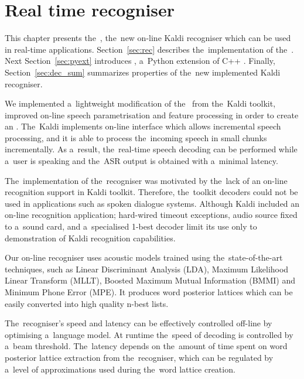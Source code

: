 \chapter{Real time recogniser}
\label{cha:decoder}
This chapter presents the~, the~new on-line Kaldi recogniser which can be used in real-time applications.
Section~\ref{sec:rec} describes the~implementation of the~.
Next Section~\ref{sec:pyext} introduces , a~Python extension of C++ .
Finally, Section~\ref{sec:dec_sum} summarizes properties of the~new implemented Kaldi recogniser.

We implemented a~lightweight modification of the~ from the~Kaldi toolkit, improved on-line speech parametrisation and feature processing in order to create an .
The~Kaldi  implements on-line interface which allows incremental speech processing, and it is able to process the~incoming speech in small chunks incrementally.
As a~result, the~real-time speech decoding can be performed while a~user is speaking and the~ASR output is obtained with a~minimal latency.

The~implementation of the~recogniser was motivated by the~lack of an on-line recognition support in Kaldi toolkit.
Therefore, the~toolkit decoders could not be used in applications such as spoken dialogue systems.
Although Kaldi included an on-line recognition application; hard-wired timeout exceptions, audio source fixed to a~sound card, and a~specialised 1-best decoder limit its use only to demonstration of Kaldi recognition capabilities.

Our on-line recogniser uses acoustic models trained using the~state-of-the-art techniques, 
such as Linear Discriminant Analysis (LDA), Maximum Likelihood Linear Transform (MLLT), Boosted Maximum Mutual Information (BMMI) and Minimum Phone Error (MPE).
It produces word posterior lattices which can be easily converted into high quality n-best lists.

The~recogniser's speed and latency can be effectively controlled off-line by optimising a~language model. 
At runtime the~speed of decoding is controlled by a~beam threshold.
The~latency depends on the~amount of time spent on word posterior lattice extraction from the~recogniser, which can be regulated by a~level of approximations used during the~word lattice creation.

